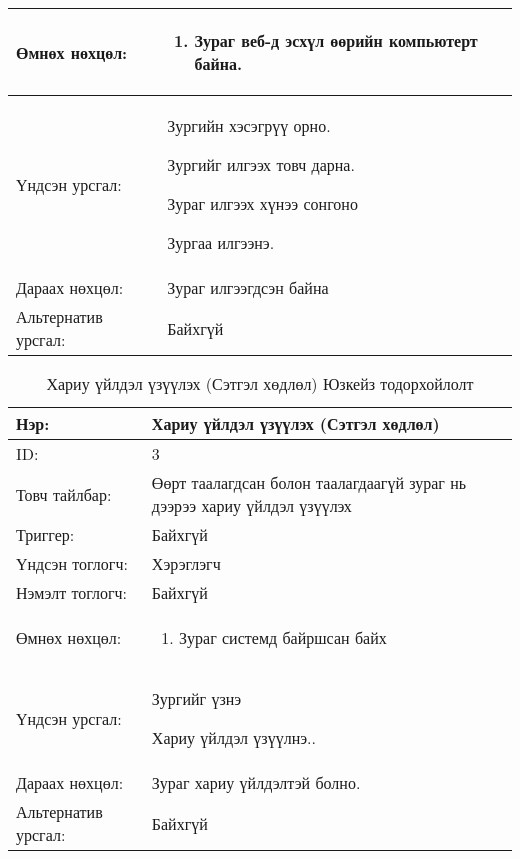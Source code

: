 \begin{itemize}
\begin{center}
\begin{table}[!htbp]
\begin{tabular}{|p{4cm}|p{11cm}|}
			Өмнөх нөхцөл: & \begin{enumerate}
				\item Зураг веб-д эсхүл өөрийн компьютерт байна.
			\end{enumerate}	\\
			\hline
			Үндсэн урсгал: & 
			
			\item Зургийн хэсэгрүү орно.
			\item Зургийг илгээх товч дарна.
			\item Зураг илгээх хүнээ сонгоно
			\item Зургаа илгээнэ.
				
			\\		 
			\hline
			Дараах нөхцөл: & Зураг илгээгдсэн байна 	\\	
			
			\hline	Альтернатив урсгал: & Байхгүй 	\\
			\hline
		\end{tabular}
	\end{table}
\end{center}

\begin{center}
	\begin{table}[!htbp]
		\caption{Хариу үйлдэл үзүүлэх (Сэтгэл хөдлөл) Юзкейз тодорхойлолт}
		\begin{tabular}{|p{4cm}|p{11cm}|}
			\hline
			Нэр: & Хариу үйлдэл үзүүлэх (Сэтгэл хөдлөл) \\
			\hline
			ID: &3 \\
			\hline
			Товч тайлбар: &Өөрт таалагдсан болон таалагдаагүй зураг нь дээрээ хариу үйлдэл үзүүлэх \\
			\hline
			Триггер: & Байхгүй \\
			\hline
			Үндсэн тоглогч: & Хэрэглэгч \\
			\hline
			Нэмэлт тоглогч: & Байхгүй \\
			\hline
			
			Өмнөх нөхцөл: & \begin{enumerate}
				\item Зураг системд байршсан байх  
			\end{enumerate}	\\
			\hline
			Үндсэн урсгал: & 
			\item Зургийг үзнэ
			\item Хариу үйлдэл үзүүлнэ..
			
			\\		 
			\hline
			Дараах нөхцөл: & Зураг хариу үйлдэлтэй болно. 	\\	
			\hline	Альтернатив урсгал: & Байхгүй 	\\
			\hline
		\end{tabular}
	\end{table}
\end{center}


\end{itemize}
